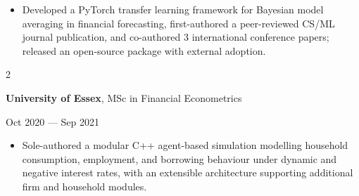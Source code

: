 \documentclass[6pt, letterpaper]{article}
\newenvironment{highlights}{
    \begin{itemize}[
        topsep=0.03 cm,
        parsep=0.03 cm,
        partopsep=0pt,
        itemsep=0pt,
        leftmargin=0 cm + 10pt
    ]
}{
    \end{itemize}
} %
\newenvironment{twocolentry}[2][]{
    \onecolentry
    \def\secondColumn{#2}
    \setcolumnwidth{\fill, 4.5 cm}
    \begin{paracol}{2}
}{
    \switchcolumn \raggedleft \secondColumn
    \end{paracol}
    \endonecolentry
} %
\begin{document}
            \begin{highlights}

            \item Developed a PyTorch transfer learning framework for Bayesian model averaging in financial forecasting, first-authored a peer-reviewed CS/ML journal publication, and co-authored 3 international conference papers; released an open-source package with external adoption.

            \end{highlights}

            \begin{twocolentry}{
                Oct 2020 --- Sep 2021
            }
            \textbf{University of Essex}, MSc in Financial Econometrics
            \end{twocolentry}

            \begin{highlights}

            \item Sole-authored a modular C++ agent-based simulation modelling household consumption, employment, and borrowing behaviour under dynamic and negative interest rates, with an extensible architecture supporting additional firm and household modules.

            \end{highlights}
\end{document}
